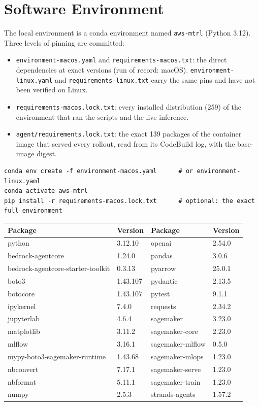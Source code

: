 \documentclass[11pt]{article}
\begin{document}
\section{Software Environment}
The local environment is a conda environment named \texttt{aws-mtrl} (Python 3.12). Three levels of pinning
are committed:
\begin{itemize}[leftmargin=*]
\item \texttt{environment-macos.yaml} and \texttt{requirements-macos.txt}: the direct dependencies at exact
versions (run of record: macOS). \texttt{environment-linux.yaml} and \texttt{requirements-linux.txt} carry the
same pins and have not been verified on Linux.
\item \texttt{requirements-macos.lock.txt}: every installed distribution (259) of the environment
that ran the scripts and the live inference.
\item \texttt{agent/requirements.lock.txt}: the exact 139 packages of the container image that
served every rollout, read from its CodeBuild log, with the base-image digest.
\end{itemize}
\begin{Verbatim}[frame=single,fontsize=\small]
conda env create -f environment-macos.yaml      # or environment-linux.yaml
conda activate aws-mtrl
pip install -r requirements-macos.lock.txt      # optional: the exact full environment
\end{Verbatim}
\begin{center}
\begin{minipage}{\linewidth}\centering
{}
\begin{tabular}{llll}
\toprule
\textbf{Package} & \textbf{Version} & \textbf{Package} & \textbf{Version} \\
\midrule
python & 3.12.10 & openai & 2.54.0 \\
bedrock-agentcore & 1.24.0 & pandas & 3.0.6 \\
bedrock-agentcore-starter-toolkit & 0.3.13 & pyarrow & 25.0.1 \\
boto3 & 1.43.107 & pydantic & 2.13.5 \\
botocore & 1.43.107 & pytest & 9.1.1 \\
ipykernel & 7.4.0 & requests & 2.34.2 \\
jupyterlab & 4.6.4 & sagemaker & 3.23.0 \\
matplotlib & 3.11.2 & sagemaker-core & 2.23.0 \\
mlflow & 3.16.1 & sagemaker-mlflow & 0.5.0 \\
mypy-boto3-sagemaker-runtime & 1.43.68 & sagemaker-mlops & 1.23.0 \\
nbconvert & 7.17.1 & sagemaker-serve & 1.23.0 \\
nbformat & 5.11.1 & sagemaker-train & 1.23.0 \\
numpy & 2.5.3 & strands-agents & 1.57.2 \\
\bottomrule
\end{tabular}
\end{minipage}
\end{center}
\end{document}
